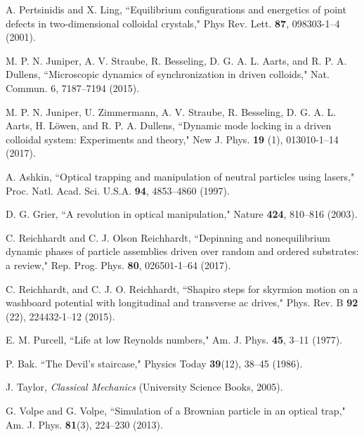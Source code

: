\documentclass[preprint,showpacs,preprintnumbers,amsmath,amssymb,aps,prb]{revtex4-1}
\theoremstyle{remark}
\begin{document}
\begin{thebibliography}{99}
    
   A. Pertsinidis and X. Ling,  ``Equilibrium configurations and energetics of point defects in two-dimensional colloidal crystals," Phys Rev. Lett.  {\bf 87}, 098303-1--4 (2001). %

   M. P. N. Juniper, A. V. Straube, R. Besseling, D. G. A. L. Aarts, and R. P. A. Dullens, ``Microscopic dynamics of synchronization in driven colloids," Nat. Commun. 6, 7187--7194 (2015). 
      
   M. P. N. Juniper,  U. Zimmermann, A. V. Straube, R. Besseling, D. G. A. L. Aarts, H. L{\"o}wen, and R. P. A. Dullens,  ``Dynamic mode locking in a driven colloidal system: Experiments and theory," New J. Phys. {\bf 19} (1), 013010-1--14 (2017).  %

   A. Ashkin, ``Optical trapping and manipulation of neutral particles using lasers," Proc. Natl. Acad. Sci. U.S.A. {\bf 94}, 4853--4860 (1997).

   D. G. Grier, ``A revolution in optical manipulation," Nature {\bf 424}, 810--816 (2003).

   C. Reichhardt and C. J. Olson Reichhardt, ``Depinning and nonequilibrium dynamic phases of particle assemblies driven over random and ordered substrates: a review," Rep. Prog. Phys. {\bf 80}, 026501-1--64 (2017). %

   C. Reichhardt, and C. J. O. Reichhardt,  ``Shapiro steps for skyrmion motion on a washboard potential with longitudinal and transverse ac drives," Phys. Rev. B {\bf 92} (22), 224432-1--12 (2015).      

   E. M. Purcell, ``Life at low Reynolds numbers,"  Am. J. Phys. {\bf 45}, 3--11 (1977).
  
   P. Bak. ``The Devil's staircase," Physics Today {\bf 39}(12), 38--45 (1986).

   J. Taylor,  {\it Classical Mechanics} (University Science Books, 2005).

   G. Volpe and G. Volpe, ``Simulation of a Brownian particle in an optical trap,"  Am. J. Phys. {\bf 81}(3), 224--230 (2013).


\end{thebibliography}
\end{document}
